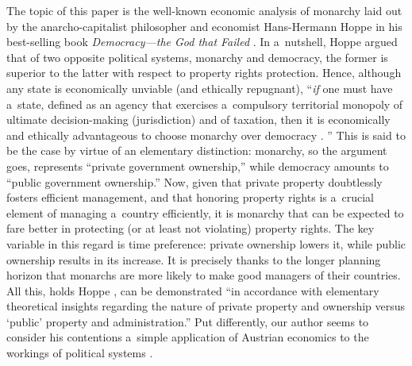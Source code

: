 The topic of this paper is the well-known economic analysis of monarchy laid out by the anarcho-capitalist philosopher and economist Hans-Hermann Hoppe in his best-selling book \textit{Democracy---the God that Failed} 
\parencite*[][]{}. %
 In a~nutshell, Hoppe argued that of two opposite political systems, monarchy and democracy, the former is superior to the latter with respect to property rights protection. Hence, although any state is economically unviable (and ethically repugnant), ``\textit{if} one must have a~state, defined as an agency that exercises a~compulsory territorial monopoly of ultimate decision-making (jurisdiction) and of taxation, then it is economically and ethically advantageous to choose monarchy over democracy 
\parencite*[][p.xx]{}.%
'' This is said to be the case by virtue of an elementary distinction: monarchy, so the argument goes, represents ``private government ownership,'' while democracy amounts to ``public government ownership.'' Now, given that private property doubtlessly fosters efficient management, and that honoring property rights is a~crucial element of managing a~country efficiently, it is monarchy that can be expected to fare better in protecting (or at least not violating) property rights. The key variable in this regard is time preference: private ownership lowers it, while public ownership results in its increase. It is precisely thanks to the longer planning horizon that monarchs are more likely to make good managers of their countries. All this, holds Hoppe 
\parencite*[][p.xix]{hoppe_democracy_2007}, %
 can be demonstrated ``in accordance with elementary theoretical insights regarding the nature of private property and ownership versus ‘public' property and administration.'' Put differently, our author seems to consider his contentions a~simple application of Austrian economics to the workings of political systems 
\parencite[][p.xxii]{hoppe_democracy_2007}.%




